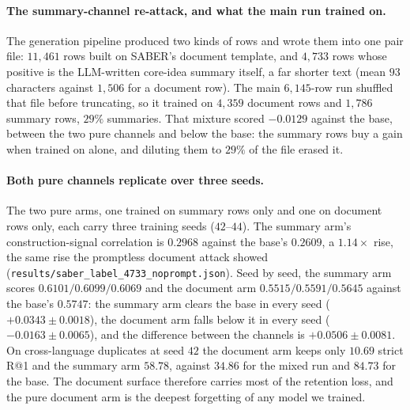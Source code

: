 \paragraph{The summary-channel re-attack, and what the main run trained on.}The generation pipeline produced two kinds of rows and wrote them into one pair file: $11{,}461$ rows built on SABER's document template, and $4{,}733$ rows whose positive is the LLM-written core-idea summary itself, a far shorter text (mean $93$ characters against $1{,}506$ for a document row). The main $6{,}145$-row run shuffled that file before truncating, so it trained on $4{,}359$ document rows and $1{,}786$ summary rows, $29\%$ summaries. That mixture scored $-0.0129$ against the base, between the two pure channels and below the base: the summary rows buy a gain when trained on alone, and diluting them to $29\%$ of the file erased it.

\paragraph{Both pure channels replicate over three seeds.}
The two pure arms, one trained on summary rows only and one on document rows only, each carry three training seeds ($42$--$44$). The summary arm's construction-signal correlation is $0.2968$ against the base's $0.2609$, a $1.14\times$ rise, the same rise the promptless document attack showed (\texttt{results/saber\_label\_4733\_noprompt.json}). Seed by seed, the summary arm scores $0.6101 / 0.6099 / 0.6069$ and the document arm $0.5515 / 0.5591 / 0.5645$ against the base's $0.5747$: the summary arm clears the base in every seed ($+0.0343 \pm 0.0018$), the document arm falls below it in every seed ($-0.0163 \pm 0.0065$), and the difference between the channels is $+0.0506 \pm 0.0081$. On cross-language duplicates at seed $42$ the document arm keeps only $10.69$ strict R@1 and the summary arm $58.78$, against $34.86$ for the mixed run and $84.73$ for the base. The document surface therefore carries most of the retention loss, and the pure document arm is the deepest forgetting of any model we trained.

